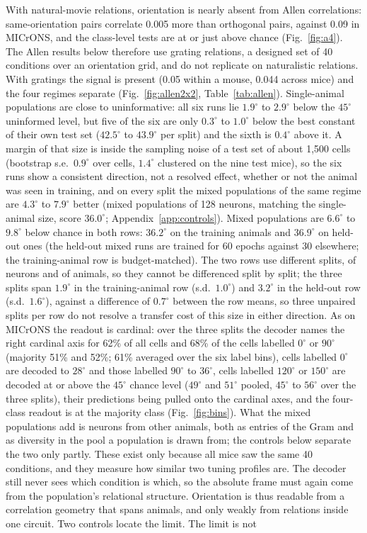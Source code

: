 \documentclass[11pt]{article}
\begin{document}
With natural-movie relations, orientation is nearly absent from Allen correlations: same-orientation pairs correlate 0.005 more than orthogonal pairs, against 0.09 in MICrONS, and the class-level tests are at or just above chance (Fig.~\ref{fig:a4}). The Allen results below therefore use grating relations, a designed set of 40 conditions over an orientation grid, and do not replicate on naturalistic relations. With gratings the signal is present (0.05 within a mouse, 0.044 across mice) and the four regimes separate (Fig.~\ref{fig:allen2x2}, Table~\ref{tab:allen}). Single-animal populations are close to uninformative: all six runs lie $1.9^\circ$ to $2.9^\circ$ below the $45^\circ$ uninformed level, but five of the six are only $0.3^\circ$ to $1.0^\circ$ below the best constant of their own test set ($42.5^\circ$ to $43.9^\circ$ per split) and the sixth is $0.4^\circ$ above it. A margin of that size is inside the sampling noise of a test set of about 1,500 cells (bootstrap s.e.\ $0.9^\circ$ over cells, $1.4^\circ$ clustered on the nine test mice), so the six runs show a consistent direction, not a resolved effect, whether or not the animal was seen in training, and on every split the mixed populations of the same regime are $4.3^\circ$ to $7.9^\circ$ better (mixed populations of 128 neurons, matching the single-animal size, score $36.0^\circ$; Appendix~\ref{app:controls}). Mixed populations are $6.6^\circ$ to $9.8^\circ$ below chance in both rows: $36.2^\circ$ on the training animals and $36.9^\circ$ on held-out ones (the held-out mixed runs are trained for 60 epochs against 30 elsewhere; the training-animal row is budget-matched). The two rows use different splits, of neurons and of animals, so they cannot be differenced split by split; the three splits span $1.9^\circ$ in the training-animal row (s.d.\ $1.0^\circ$) and $3.2^\circ$ in the held-out row (s.d.\ $1.6^\circ$), against a difference of $0.7^\circ$ between the row means, so three unpaired splits per row do not resolve a transfer cost of this size in either direction. As on MICrONS the readout is cardinal: over the three splits the decoder names the right cardinal axis for 62\% of all cells and 68\% of the cells labelled $0^\circ$ or $90^\circ$ (majority 51\% and 52\%; 61\% averaged over the six label bins), cells labelled $0^\circ$ are decoded to $28^\circ$ and those labelled $90^\circ$ to $36^\circ$, cells labelled $120^\circ$ or $150^\circ$ are decoded at or above the $45^\circ$ chance level ($49^\circ$ and $51^\circ$ pooled, $45^\circ$ to $56^\circ$ over the three splits), their predictions being pulled onto the cardinal axes, and the four-class readout is at the majority class (Fig.~\ref{fig:bins}). What the mixed populations add is neurons from other animals, both as entries of the Gram and as diversity in the pool a population is drawn from; the controls below separate the two only partly. These exist only because all mice saw the same 40 conditions, and they measure how similar two tuning profiles are. The decoder still never sees which condition is which, so the absolute frame must again come from the population's relational structure. Orientation is thus readable from a correlation geometry that spans animals, and only weakly from relations inside one circuit. Two controls locate the limit. The limit is not 
\end{document}
